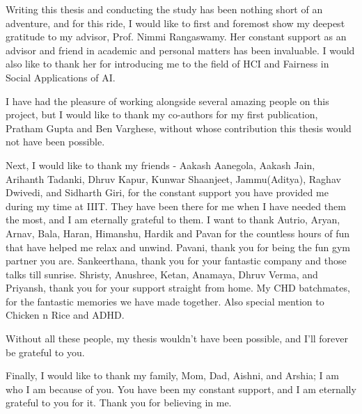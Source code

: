 Writing this thesis and conducting the study has been nothing short of an adventure, and for this ride, I would like to first and foremost show my deepest gratitude to my advisor, Prof. Nimmi Rangaswamy. Her constant support as an advisor and friend in academic and personal matters has been invaluable. I would also like to thank her for introducing me to the field of HCI and Fairness in Social Applications of AI.

I have had the pleasure of working alongside several amazing people on this project, but I would like to thank my co-authors for my first publication, Pratham Gupta and Ben Varghese, without whose contribution this thesis would not have been possible. 

Next, I would like to thank my friends - Aakash Aanegola, Aakash Jain, Arihanth Tadanki, Dhruv Kapur, Kunwar Shaanjeet, Jammu(Aditya), Raghav Dwivedi, and Sidharth Giri, for the constant support you have provided me during my time at IIIT. They have been there for me when I have needed them the most, and I am eternally grateful to them. I want to thank Autrio, Aryan, Arnav, Bala, Haran, Himanshu, Hardik and Pavan for the countless hours of fun that have helped me relax and unwind. Pavani, thank you for being the fun gym partner you are. Sankeerthana, thank you for your fantastic company and those talks till sunrise. Shristy, Anushree, Ketan, Anamaya, Dhruv Verma, and Priyansh, thank you for your support straight from home. My CHD batchmates, for the fantastic memories we have made together. Also special mention to Chicken n Rice and ADHD.

Without all these people, my thesis wouldn't have been possible, and I'll forever be grateful to you.

Finally, I would like to thank my family, Mom, Dad, Aishni, and Arshia; I am who I am because of you. You have been my constant support, and I am eternally grateful to you for it. Thank you for believing in me.